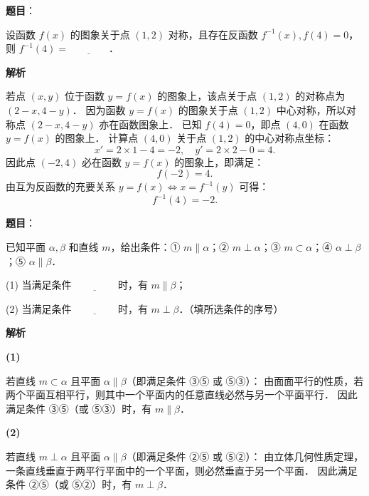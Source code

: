 \begin{answer}

\textbf{题目}：

设函数 $f(x)$ 的图象关于点 $(1, 2)$ 对称，且存在反函数 $f^{-1}(x), f(4) = 0$，则 $f^{-1}(4) = \underline{\qquad\qquad}$．

\textbf{解析}

若点 $(x, y)$ 位于函数 $y = f(x)$ 的图象上，该点关于点 $(1, 2)$ 的对称点为 $(2 - x, 4 - y)$．
因为函数 $y = f(x)$ 的图象关于点 $(1, 2)$ 中心对称，所以对称点 $(2 - x, 4 - y)$ 亦在函数图象上．
已知 $f(4) = 0$，即点 $(4, 0)$ 在函数 $y = f(x)$ 的图象上．
计算点 $(4, 0)$ 关于点 $(1, 2)$ 的中心对称点坐标：
\nopagebreak[4]
\[
x' = 2 \times 1 - 4 = -2, \quad y' = 2 \times 2 - 0 = 4.
\]
因此点 $(-2, 4)$ 必在函数 $y = f(x)$ 的图象上，即满足：
\nopagebreak[4]
\[
f(-2) = 4.
\]
由互为反函数的充要关系 $y = f(x) \iff x = f^{-1}(y)$ 可得：
\nopagebreak[4]
\[
f^{-1}(4) = -2.
\]


\end{answer}
\begin{answer}

\textbf{题目}：

已知平面 $\alpha, \beta$ 和直线 $m$，给出条件：① $m \parallel \alpha$；② $m \perp \alpha$；③ $m \subset \alpha$；④ $\alpha \perp \beta$；⑤ $\alpha \parallel \beta$．

(1) 当满足条件 $\underline{\qquad\qquad}$ 时，有 $m \parallel \beta$；

(2) 当满足条件 $\underline{\qquad\qquad}$ 时，有 $m \perp \beta$．（填所选条件的序号）

\textbf{解析}

\textbf{(1)}

若直线 $m \subset \alpha$ 且平面 $\alpha \parallel \beta$（即满足条件 ③⑤ 或 ⑤③）：
由面面平行的性质，若两个平面互相平行，则其中一个平面内的任意直线必然与另一个平面平行．
因此满足条件 ③⑤（或 ⑤③）时，有 $m \parallel \beta$．

\textbf{(2)}

若直线 $m \perp \alpha$ 且平面 $\alpha \parallel \beta$（即满足条件 ②⑤ 或 ⑤②）：
由立体几何性质定理，一条直线垂直于两平行平面中的一个平面，则必然垂直于另一个平面．
因此满足条件 ②⑤（或 ⑤②）时，有 $m \perp \beta$．



\end{answer}
